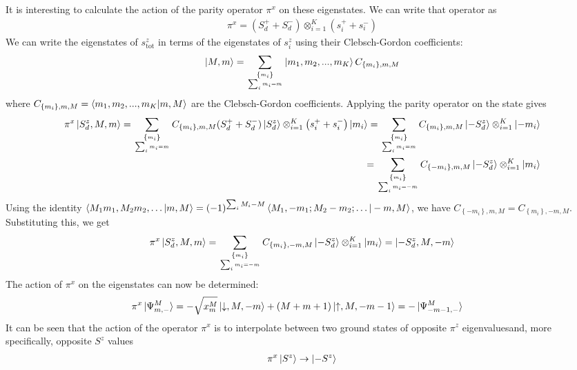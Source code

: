 \documentclass{revtex4-2}
\begin{document}
It is interesting to calculate the action of the parity operator \(\pi^x\) on these eigenstates. We can write that operator as
\begin{align}
	\pi^x = (S_d^+ + S_d^-)\otimes_{i=1}^K \left(s_i^+ + s_i^-\right) 
\end{align}
We can write the eigenstates of \(s_\text{tot}^z\) in terms of the eigenstates of \(s_i^z\) using their Clebsch-Gordon coefficients:
\begin{align}
	\ket{M,m} = \sum_{\left\{m_i\right\}\atop{\sum_i m_i = m}}\ket{m_1,m_2,...,m_K} C_{\left\{m_i\right\},m,M}
\end{align}
where \(C_{\left\{m_i\right\},m,M} = \braket{m_1,m_2,...,m_K|m,M}\) are the Clebsch-Gordon coefficients. Applying the parity operator on the state gives
\begin{align}
	\pi^x \ket{S_d^z, M,m} = \sum_{\left\{m_i\right\}\atop{\sum_i m_i = m}}C_{\left\{m_i\right\},m,M}(S_d^+ + S_d^-)\ket{S_d^z}\otimes_{i=1}^K \left(s_i^+ + s_i^-\right)\ket{m_i} = \sum_{\left\{m_i\right\}\atop{\sum_i m_i = m}}C_{\left\{m_i\right\},m,M}\ket{-S_d^z}\otimes_{i=1}^K\ket{-m_i}\\
	=\sum_{\left\{m_i\right\}\atop{\sum_i m_i = -m}}C_{\left\{-m_i\right\},m,M}\ket{-S_d^z}\otimes_{i=1}^K\ket{m_i}
\end{align}
Using the identity \(\braket{M_1m_1,M_2m_2,\ldots|m,M} = \left( -1 \right)^{\sum_i M_i - M}\braket{M_1, -m_1; M_2 -m_2;\ldots|-m,M}\), we have \(C_{\left\{-m_i\right\},m,M} = C_{\left\{m_i\right\},-m,M}\). Substituting this, we get
\begin{align}
	\pi^x \ket{S_d^z, M,m} = \sum_{\left\{m_i\right\}\atop{\sum_i m_i = -m}}C_{\left\{m_i\right\},-m,M}\ket{-S_d^z}\otimes_{i=1}^K\ket{m_i} = \ket{-S_d^z, M, -m}
\end{align}
The action of \(\pi^x\) on the eigenstates can now be determined:
\begin{align}
	\pi^x \ket{\Psi^M_{m,-}} &=-\sqrt{x_m^M}\ket{\downarrow, M, -m} + \left(M + m + 1\right)\ket{\uparrow,M,-m-1} = -\ket{\Psi^M_{-m-1,-}}
\end{align}
It can be seen that the action of the operator \(\pi^x\) is to interpolate between two ground states of opposite \(\pi^z\) eigenvaluesand, more specifically, opposite \(S^z\) values
\begin{align}
	\pi^x \ket{S^z} \to \ket{-S^z}
\end{align}
\end{document}
